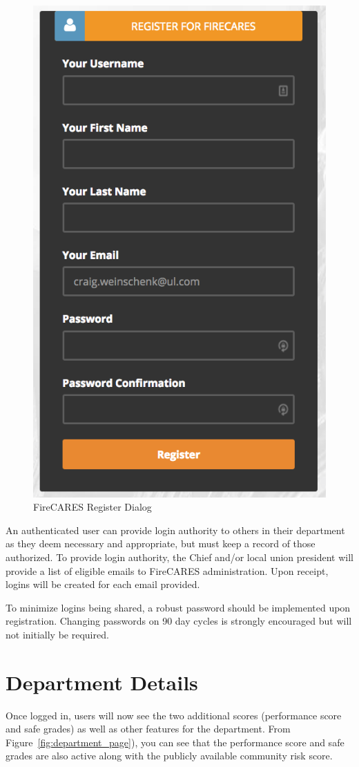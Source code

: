 \documentclass[12pt,oneside]{book}
\begin{document}
\begin{figure}[ht!]
\centering
\includegraphics[width=.5\columnwidth]{Figures/login2}
\caption{FireCARES Register Dialog}
\label{fig:login2}
\end{figure}

An authenticated user can provide login authority to others in their department as they deem necessary and appropriate, but must keep a record of those authorized. To provide login authority, the Chief and/or local union president will provide a list of eligible emails to FireCARES administration.  Upon receipt, logins will be created for each email provided.

To minimize logins being shared, a robust password should be implemented upon registration. Changing passwords on 90 day cycles is strongly encouraged but will not initially be required.

\FloatBarrier

\section{Department Details}

Once logged in, users will now see the two additional scores (performance score and safe grades) as well as other features for the department. From Figure~\ref{fig:department_page}), you can see that the performance score and safe grades are also active along with the publicly available community risk score.
\end{document}
